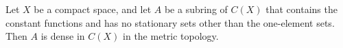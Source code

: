 Let $X$ be a compact space, and let $A$ be a subring of $C(X)$ that contains the constant functions and has no stationary sets other than the one-element sets. Then $A$ is dense in $C(X)$ in the metric topology.
